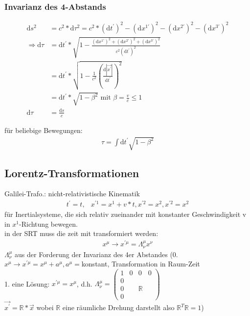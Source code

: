 \documentclass[a4paper]{article}
\begin{document}
\subsubsection{Invarianz des 4-Abstands} 
\begin{align}
\mathrm{d}s^2&=c^2*\mathrm{d}\tau^2=c^2*(\mathrm{d}t^{'})^2-(\mathrm{d}x^{1'})^2-(\mathrm{d}x^{2'})^2-(\mathrm{d}x^{3'})^2\\
\Rightarrow
\mathrm{d}\tau&=\mathrm{d}t^{'}*\sqrt{1-\frac{(\mathrm{d}x^{1'})^2+(\mathrm{d}x^{2'})^2+(\mathrm{d}x^{3'})^2}{c^2
(\mathrm{d}t^{'})^2}}\\
&=\mathrm{d}t^{'}*\sqrt{1-\frac{1}{c^2}\left(\frac{\mathrm{d}|\vec{x^{'}}|}{\mathrm{d}t^{'}}\right)^2}\\
&=\mathrm{d}t^{'}*\sqrt{1-\beta^2}\text{ mit }\beta=\frac{v}{c}\leq1 \\
\mathrm{d}\tau&=\frac{\mathrm{d}s}{c}
\end{align}

für beliebige Bewegungen:
\begin{align}
\tau=\int \mathrm{d}t^{'}\sqrt{1-\beta^2}
\end{align}
\subsection{Lorentz-Transformationen}
Galilei-Trafo.: nicht-relativistische Kinematik
\begin{align}
t^{'}=t, & x^{'1}=x^1+v*t, x^{'2}=x^2,x^{'2}=x^2
\end{align}
für Inertialsysteme, die sich relativ zueinander mit konstanter Geschwindigkeit
v in $x^1$-Richtung bewegen.\\
in der SRT muss die zeit mit transformiert werden:
\begin{align}
x^{\mu}\rightarrow x^{'\mu}=\Lambda^\mu_\nu x^\nu
\end{align}
$\Lambda^\mu_\nu$ aus der Forderung der Invarianz des 4er Abstandes
(0. $x^{\mu}\rightarrow x^{'\mu}=x^{\mu}+a^{\mu}, a^\mu=$konstant,
Transformation in Raum-Zeit\\
1. eine Lösung: $x^{'\mu}=x^{\mu}$, d.h. $\Lambda^\mu_\nu= \begin{pmatrix} 1 &
0& 0&0\\ 0& \\ 0& &  \mathbb{R} \\ 0 \end{pmatrix}$ \\
$\vec{x^{'}}= \mathbb{R}*\vec{x}$ wobei $ \mathbb{R}$ eine räumliche Drehung
darstellt also $ \mathbb{R}^T \mathbb{R}= 1$)\\
\end{document}
